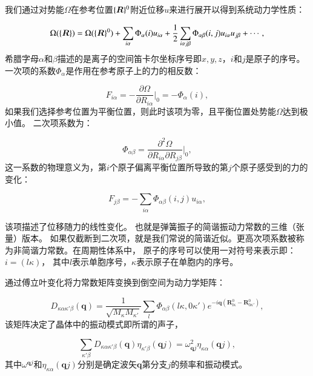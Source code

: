我们通过对势能$\Omega$在参考位置$\{\bm{R}\}^0$附近位移$u$来进行展开以得到系统动力学性质：

\begin{equation}
  \Omega(\{\bm{R}\}) = \Omega(\{\bm{R}\}^0) + \sum_{i\alpha} \Phi_\alpha(i)u_{i\alpha} + \frac{1}{2} \sum_{i\alpha j\beta} \Phi_{\alpha\beta}(i,j) u_{i\alpha}u_{j\beta} + \cdots ,
\end{equation}
希腊字母$\alpha$和$\beta$描述的是离子的空间笛卡尔坐标序号即$x,y,z$，$i$和$j$是原子的序号。一次项的系数$\Phi_\alpha$是作用在参考原子上的力的相反数：

\begin{equation}
  F_{i\alpha} = -\frac{\partial\Omega}{\partial R_{i\alpha}}\bigg|_0 = -\Phi_\alpha(i) ,
\end{equation}
如果我们选择参考位置为平衡位置，则此时该项为零，且平衡位置处势能$\Omega$达到极小值。
二次项系数为：

\begin{equation}\label{eq:omega_second_order}
  \Phi_{\alpha\beta} = \frac{\partial^2\Omega}{\partial R_{i\alpha}\partial R_{j\beta}} \bigg|_0 ,
\end{equation}
这一系数的物理意义为，第$i$个原子偏离平衡位置所导致的第$j$个原子感受到的力的变化：

\begin{equation}
  F_{j\beta} = -\sum_{i\alpha} \Phi_{\alpha\beta}(i,j)u_{i\alpha} ,
\end{equation}

该项描述了位移随力的线性变化。
也就是弹簧振子的简谐振动力常数的三维（张量）版本。
如果仅截断到二次项，就是我们常说的简谐近似。更高次项系数被称为非简谐力常数。在周期性体系中，
原子的序号可以使用一对符号来表示即：$i=(l\kappa)$，
其中$l$表示单胞序号，$\kappa$表示原子在单胞内的序号。

通过傅立叶变化将力常数矩阵变换到倒空间为动力学矩阵：

\begin{equation}
  D_{\kappa\alpha\kappa'\beta}(\bm{q}) = \frac{1}{\sqrt{M_\kappa M_{\kappa'}}} \sum_l \Phi_{\alpha\beta}(l\kappa,0\kappa')e^{-i\bm{q}(\bm{R}^0_{l\kappa}-\bm{R}^0_{0\kappa'})} ,
\end{equation}
该矩阵决定了晶体中的振动模式即所谓的声子，

\begin{equation}
  \sum_{\kappa'\beta}D_{\kappa\alpha\kappa'\beta}(\bm{q})\eta_{\kappa'\beta}(\bm{q}j) = \omega^2_{\bm{q}j}\eta_{\kappa\alpha}(\bm{q}j) ,
\end{equation}
其中$\omega^{\bm{q}j}$和$\eta_{\kappa\alpha}(\bm{q}j)$分别是确定波矢$\bm{q}$第分支$j$的频率和振动模式。

